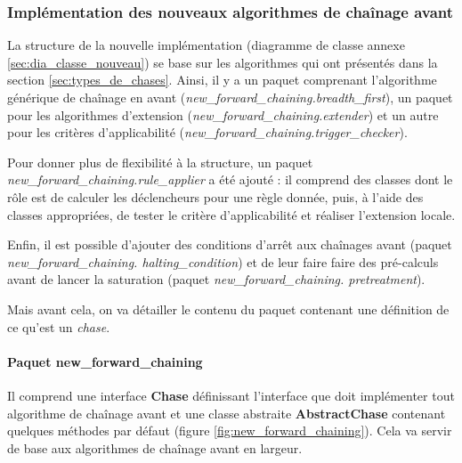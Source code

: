      
     
     
    \subsubsection{Implémentation des nouveaux algorithmes de chaînage avant}\label{subsec:implementation_dans_graal}
       
       La structure de la nouvelle implémentation (diagramme de classe annexe \ref{sec:dia_classe_nouveau}) se base sur les algorithmes qui ont présentés dans la section \ref{sec:types_de_chases}. Ainsi, il y a un paquet comprenant l'algorithme générique de chaînage en avant (\textit{new\_forward\_chaining.breadth\_first}), un paquet pour les algorithmes d'extension (\textit{new\_forward\_chaining.extender}) et un autre pour les critères d'applicabilité (\textit{new\_forward\_chaining.trigger\_checker}).
       \par Pour donner plus de flexibilité à la structure, un paquet \textit{new\_forward\_chaining.rule\_applier} a été ajouté : il comprend des classes dont le rôle est de calculer les déclencheurs pour une règle donnée, puis, à l'aide des classes appropriées, de tester le critère d'applicabilité et réaliser l'extension locale.
       \par Enfin, il est possible d'ajouter des conditions d'arrêt aux chaînages avant (paquet \textit{new\_forward\_chaining. halting\_condition}) et de leur faire faire des pré-calculs avant de lancer la saturation (paquet \textit{new\_forward\_chaining. pretreatment}).
       \par Mais avant cela, on va détailler le contenu du paquet contenant une définition de ce qu'est un \textit{chase}.
       
       \paragraph{Paquet new\_forward\_chaining} Il comprend une interface \textbf{Chase} définissant l'interface que doit implémenter tout algorithme de chaînage avant et une classe abstraite \textbf{AbstractChase} contenant quelques méthodes par défaut (figure \ref{fig:new_forward_chaining}). Cela va servir de base aux algorithmes de chaînage avant en largeur.
       
